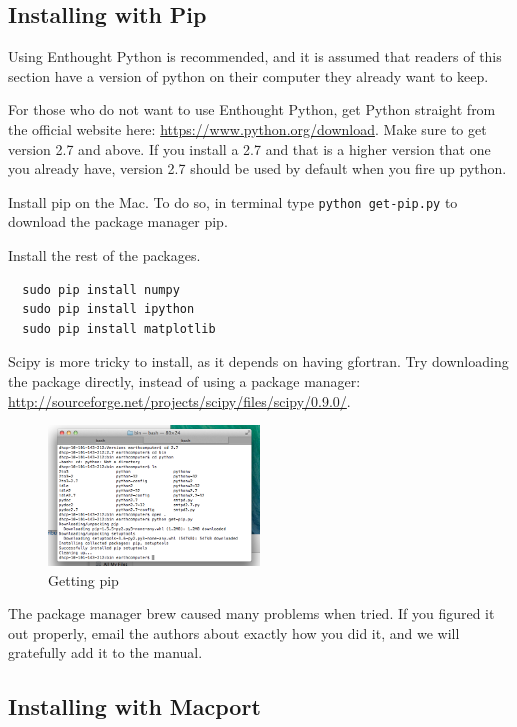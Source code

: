 \documentclass[letterpaper,10pt]{article}
\begin{document}
\subsection{Installing with Pip}

Using Enthought Python is recommended, and it is assumed that readers of this section have a version of python on their computer they already want to keep.

For those who do not want to use Enthought Python, get Python straight from the official website here: \url{https://www.python.org/download}.  Make sure to get version 2.7 and above. If you install a 2.7 and that is a higher version that one you already have, version 2.7 should be used by default when you fire up python. 

Install pip on the Mac. To do so, in terminal type \texttt{python get-pip.py} to download the package manager pip.

Install the rest of the packages.
\begin{verbatim}
  sudo pip install numpy
  sudo pip install ipython
  sudo pip install matplotlib
\end{verbatim}

Scipy is more tricky to install, as it depends on having gfortran. Try downloading the package directly, instead of using a package manager: \url{http://sourceforge.net/projects/scipy/files/scipy/0.9.0/}.

\begin{figure}[h!]
  \centering
  \includegraphics[width=0.5\textwidth]{images/getting_pip}
  \caption{Getting pip}
  \label{fig:getting_pip}
\end{figure}

The package manager brew caused many problems when tried. If you figured it out properly, email the authors about exactly how you did it, and we will gratefully add it to the manual. 


\subsection{Installing with Macport}
\end{document}
